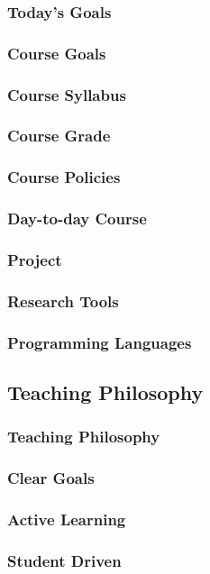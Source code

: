 \documentclass{beamer}
\begin{document}
\begin{frame}
\frametitle{Today's Goals}
\end{frame}
\begin{frame}
\frametitle{Course Goals}
\end{frame}
\begin{frame}
\frametitle{Course Syllabus}
\end{frame}
\begin{frame}
\frametitle{Course Grade}
\end{frame}
\begin{frame}
\frametitle{Course Policies}
\end{frame}
\begin{frame}
\frametitle{Day-to-day Course}
\end{frame}
\begin{frame}
\frametitle{Project}
\end{frame}
\begin{frame}
\frametitle{Research Tools}
\end{frame}
\begin{frame}
\frametitle{Programming Languages}
\end{frame}

\subsection{Teaching Philosophy}
\begin{frame}
\frametitle{Teaching Philosophy}
\end{frame}
\begin{frame}
\frametitle{Clear Goals}
%
\end{frame}
\begin{frame}
\frametitle{Active Learning}
%
\end{frame}
\begin{frame}
\frametitle{Student Driven}
%
\end{frame}
\end{document}
